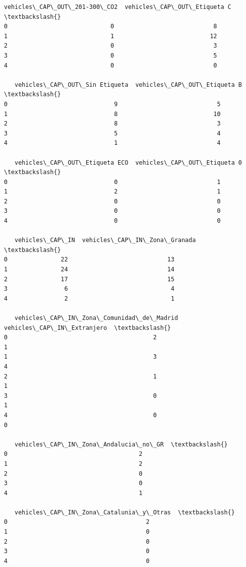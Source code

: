 \documentclass[11pt]{article}
\begin{document}
\begin{tcolorbox}[breakable, size=fbox, boxrule=.5pt, pad at break*=1mm, opacityfill=0]
\begin{Verbatim}[commandchars=\\\{\}]
   vehicles\_CAP\_OUT\_201-300\_CO2  vehicles\_CAP\_OUT\_Etiqueta C  \textbackslash{}
0                             0                            8
1                             1                           12
2                             0                            3
3                             0                            5
4                             0                            0

   vehicles\_CAP\_OUT\_Sin Etiqueta  vehicles\_CAP\_OUT\_Etiqueta B  \textbackslash{}
0                              9                            5
1                              8                           10
2                              8                            3
3                              5                            4
4                              1                            4

   vehicles\_CAP\_OUT\_Etiqueta ECO  vehicles\_CAP\_OUT\_Etiqueta 0  \textbackslash{}
0                              0                            1
1                              2                            1
2                              0                            0
3                              0                            0
4                              0                            0

   vehicles\_CAP\_IN  vehicles\_CAP\_IN\_Zona\_Granada  \textbackslash{}
0               22                            13
1               24                            14
2               17                            15
3                6                             4
4                2                             1

   vehicles\_CAP\_IN\_Zona\_Comunidad\_de\_Madrid  vehicles\_CAP\_IN\_Extranjero  \textbackslash{}
0                                         2                           1
1                                         3                           4
2                                         1                           1
3                                         0                           1
4                                         0                           0

   vehicles\_CAP\_IN\_Zona\_Andalucia\_no\_GR  \textbackslash{}
0                                     2
1                                     2
2                                     0
3                                     0
4                                     1

   vehicles\_CAP\_IN\_Zona\_Catalunia\_y\_Otras  \textbackslash{}
0                                       2
1                                       0
2                                       0
3                                       0
4                                       0


\end{Verbatim}
\end{tcolorbox}
\end{document}
